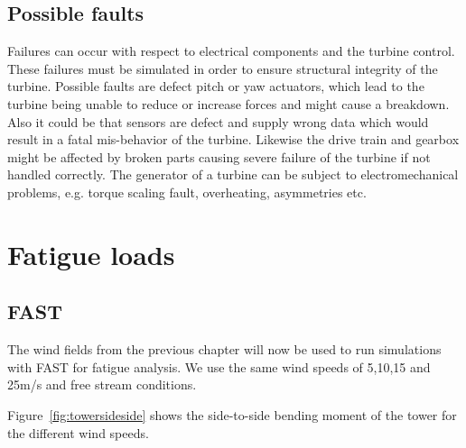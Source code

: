 \documentclass[10pt]{article}
\begin{document}
\subsection{Possible faults}
Failures can occur with respect to electrical components and the turbine control. These failures must be simulated in order to ensure structural integrity of the turbine. Possible faults are defect pitch or yaw actuators, which lead to the turbine being unable to reduce or increase forces and might cause a breakdown. Also it could be that sensors are defect and supply wrong data which would result in a fatal mis-behavior of the turbine. 
Likewise the drive train and gearbox might be affected by broken parts causing severe failure of the turbine if not handled correctly. The generator of a turbine can be subject to electromechanical problems, e.g. torque scaling fault, overheating, asymmetries etc.

\section{Fatigue loads}
\subsection{FAST}
The wind fields from the previous chapter will now be used to run simulations with FAST for fatigue analysis.
We use the same wind speeds of 5,10,15 and 25m/s and free stream conditions. 

Figure~\ref{fig:towersideside} shows the side-to-side bending moment of the tower for the different wind speeds.
\end{document}
